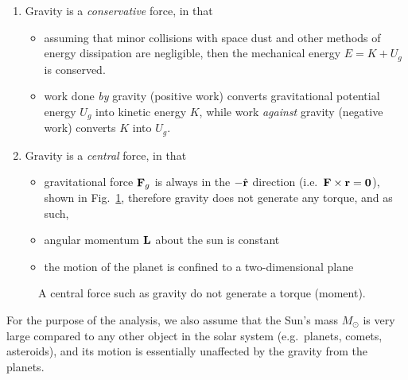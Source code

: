 \documentclass[11pt]{article}
\newcommand{\mb}[1]{
  \ensuremath\mathbf{#1}
}
\begin{document}
\begin{enumerate}[leftmargin=18pt,topsep=0pt]
\item Gravity is a \emph{conservative} force, in that
  \begin{itemize}[leftmargin=15pt,noitemsep,topsep=0pt]
  \item assuming that minor collisions with space dust and other methods of
    energy dissipation are negligible, then the mechanical energy
    $E=K+U_g$ is conserved.
  \item work done \emph{by} gravity (positive work) converts gravitational
    potential energy $U_g$ into kinetic energy $K$, while work \emph{against}
    gravity (negative work) converts $K$ into $U_g$.
  \end{itemize}
\item Gravity is a \emph{central} force, in that
  \begin{itemize}[leftmargin=15pt,noitemsep,topsep=0pt]
  \item gravitational force $\mb{F}_g$ is always in the $-\hat{\mb{r}}$
    direction (i.e.\ $\mb{F}\times\mb{r}=\mb{0}$), shown in
    Fig.~\ref{central-force}, therefore gravity does not generate any torque,
    and as such,
  \item angular momentum $\mb{L}$ about the sun is constant
  \item the motion of the planet is confined to a two-dimensional plane
  \end{itemize}
\end{enumerate}
\begin{figure}[!ht]
  \centering
  \caption{A central force such as gravity do not generate a torque (moment).}
  \label{central-force}
\end{figure}
For the purpose of the analysis, we also assume that the Sun's mass $M_\odot$
is very large compared to any other object in the solar system (e.g.\ planets,
comets, asteroids), and its motion is essentially unaffected by the gravity
from the planets.
\end{document}
